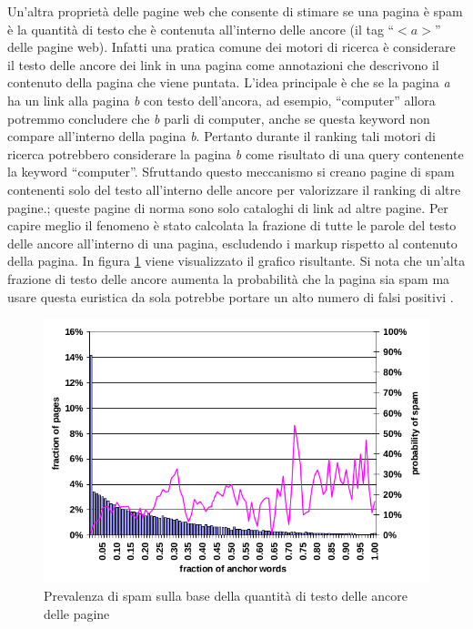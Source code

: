 Un'altra proprietà delle pagine web che consente di stimare se una pagina è spam è la quantità di testo che è contenuta all'interno delle ancore (il tag ``\(<a>\)'' delle pagine web). Infatti una pratica comune dei motori di ricerca è considerare il testo delle ancore dei link in una pagina come annotazioni che descrivono il contenuto della pagina che viene puntata. L'idea principale è che se la pagina \textit{a} ha un link alla pagina \textit{b} con testo dell'ancora, ad esempio, ``computer'' allora potremmo concludere che \textit{b} parli di computer, anche se questa keyword non compare all'interno della pagina \textit{b}. Pertanto durante il ranking tali motori di ricerca potrebbero considerare la pagina \textit{b} come risultato di una query contenente la keyword ``computer''. Sfruttando questo meccanismo si creano pagine di spam contenenti solo del testo all'interno delle  ancore per valorizzare il ranking di altre pagine.; queste pagine di norma sono solo cataloghi di link ad altre pagine. Per 
capire meglio il fenomeno è stato calcolata la frazione di tutte le parole del testo delle ancore all'interno di una pagina, escludendo i markup rispetto al contenuto della pagina. In figura \ref{fig:fetterly6} viene visualizzato il grafico risultante. Si nota che un'alta frazione di testo delle ancore aumenta la probabilità che la pagina sia spam ma usare questa euristica da sola potrebbe portare un alto numero di falsi positivi \cite{Ntoulas:2006:DSW:1135777.1135794}.
\begin{figure}[htbp]
\centering
\includegraphics[width=12cm]{immagini/fetterly/fetterly6}
\caption{Prevalenza di spam sulla base della quantità di testo delle ancore delle pagine}
\label{fig:fetterly6}
\end{figure}


